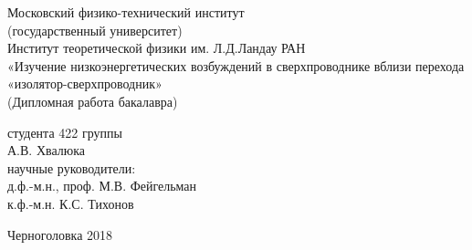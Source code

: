 \begin{titlepage}
\begin{center}
\large
Московский физико-технический институт\\
(государственный университет)\\
Институт теоретической физики им. Л.Д.Ландау РАН\\
\vspace{6cm}
\LARGE
«Изучение низкоэнергетических возбуждений в сверхпроводнике вблизи перехода «изолятор-сверхпроводник»\\
\large
(Дипломная работа бакалавра)
\vspace{2cm}

\begin{flushright}
 \large
 студента 422 группы\\
 А.В. Хвалюка\\
 научные руководители:\\
 д.ф.-м.н., проф. М.В. Фейгельман\\
 к.ф.-м.н. К.С. Тихонов
\end{flushright}
\vspace{\fill}
Черноголовка 2018
\end{center}
\end{titlepage}